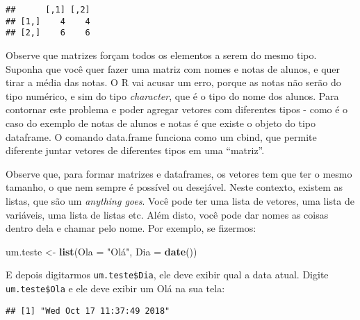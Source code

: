 \documentclass[]{book}
\newenvironment{Shaded}{\begin{snugshade}}{\end{snugshade}}
\newcommand{\KeywordTok}[1]{\textcolor[rgb]{0.13,0.29,0.53}{\textbf{#1}}}
\newcommand{\DataTypeTok}[1]{\textcolor[rgb]{0.13,0.29,0.53}{#1}}
\newcommand{\StringTok}[1]{\textcolor[rgb]{0.31,0.60,0.02}{#1}}
\newcommand{\OperatorTok}[1]{\textcolor[rgb]{0.81,0.36,0.00}{\textbf{#1}}}
\newcommand{\NormalTok}[1]{#1}
\begin{document}
\begin{verbatim}
##      [,1] [,2]
## [1,]    4    4
## [2,]    6    6
\end{verbatim}

Observe que matrizes forçam todos os elementos a serem do mesmo tipo.
Suponha que você quer fazer uma matriz com nomes e notas de alunos, e
quer tirar a média das notas. O R vai acusar um erro, porque as notas
não serão do tipo numérico, e sim do tipo \emph{character}, que é o tipo
do nome dos alunos. Para contornar este problema e poder agregar vetores
com diferentes tipos - como é o caso do exemplo de notas de alunos e
notas é que existe o objeto do tipo dataframe. O comando data.frame
funciona como um cbind, que permite diferente juntar vetores de
diferentes tipos em uma ``matriz''.

Observe que, para formar matrizes e dataframes, os vetores tem que ter o
mesmo tamanho, o que nem sempre é possível ou desejável. Neste contexto,
existem as listas, que são um \emph{anything goes}. Você pode ter uma
lista de vetores, uma lista de variáveis, uma lista de listas etc. Além
disto, você pode dar nomes as coisas dentro dela e chamar pelo nome. Por
exemplo, se fizermos:

\begin{Shaded}
\begin{Highlighting}[]
\NormalTok{um.teste <-}\StringTok{ }\KeywordTok{list}\NormalTok{(}\DataTypeTok{Ola =} \StringTok{"Olá"}\NormalTok{, }\DataTypeTok{Dia =} \KeywordTok{date}\NormalTok{())}
\end{Highlighting}
\end{Shaded}

E depois digitarmos \texttt{um.teste\$Dia}, ele deve exibir qual a data
atual. Digite \texttt{um.teste\$Ola} e ele deve exibir um Olá na sua
tela:

\begin{Shaded}
\end{Shaded}

\begin{verbatim}
## [1] "Wed Oct 17 11:37:49 2018"
\end{verbatim}

\begin{Shaded}
\end{Shaded}
\end{document}
